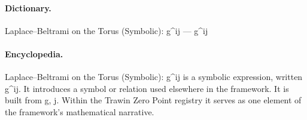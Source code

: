 \paragraph{Dictionary.}
Laplace–Beltrami on the Torus (Symbolic): g\textasciicircum{}ij — g\textasciicircum{}ij

\paragraph{Encyclopedia.}
Laplace–Beltrami on the Torus (Symbolic): g\textasciicircum{}ij is a symbolic expression, written g\textasciicircum{}ij. It introduces a symbol or relation used elsewhere in the framework. It is built from g, j. Within the Trawin Zero Point registry it serves as one element of the framework's mathematical narrative.
